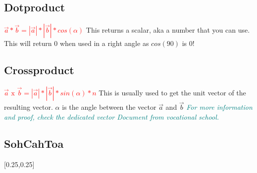 \documentclass[main.tex,fontsize=8pt,paper=a4,paper=portrait,DIV=calc,]{scrartcl}
\begin{document}
\begin{multicols*}{2}
\subsection{Dotproduct}
\Large{\textbf{\textcolor{red}{\( \vec{a} * \vec{b} = |\vec{a}| * |\vec{b}| * cos(\alpha) \)}}}\newline
\normalsize This returns a scalar, aka a number that you can use.\newline
This will return 0 when used in a right angle as \(cos(90)\) is 0!\\
\subsection{Crossproduct}
\Large{\textbf{\textcolor{red}{\( \vec{a} \text{ x } \vec{b} = |\vec{a}| * |\vec{b}| * sin(\alpha) * n \)}}}\newline
\normalsize This is usually used to get the unit vector of the resulting vector.\newline
\(\alpha\) is the angle between the vector \(\vec{a}\) and \(\vec{b}\)\newline
\emph{\textcolor{teal}{For more information and proof, check the dedicated vector Document from vocational school.}}\\

\subsection{SohCahToa}
[0.25,0.25]


\end{multicols*}
\end{document}
